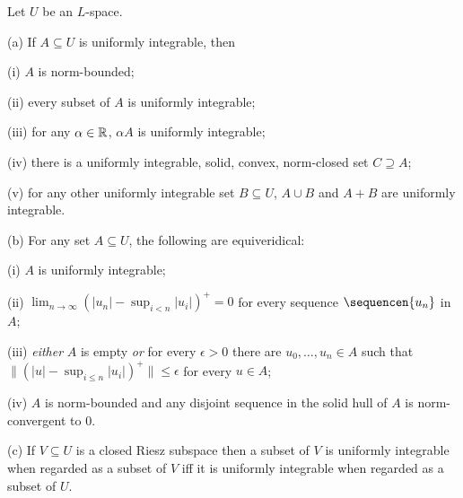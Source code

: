  Let $U$ be an $L$-space.

(a) If $A\subseteq U$ is uniformly integrable, then

\quad (i) $A$ is norm-bounded;

\quad (ii) every subset of $A$ is uniformly integrable;

\quad (iii) for any $\alpha\in\Bbb R$, $\alpha A$ is uniformly
integrable;

\quad (iv) there is a uniformly integrable, solid, convex, norm-closed
set $C\supseteq A$;

\quad (v) for any other uniformly integrable set $B\subseteq U$, $A\cup
B$ and $A+B$ are uniformly integrable.

(b) For any set $A\subseteq U$, the following are equiveridical:

\quad (i) $A$ is uniformly integrable;

\quad (ii) $\lim_{n\to\infty}(|u_n|-\sup_{i<n}|u_i|)^+=0$ for every
sequence $\sequencen{u_n}$ in $A$;

\quad (iii) {\it either} $A$ is empty {\it or} for every $\epsilon>0$
there are $u_0,\ldots,u_n\in A$ such that
\ifdim\pagewidth=390pt\penalty-1000\fi
$\|(|u|-\sup_{i\le n}|u_i|)^+\|\le\epsilon$ for every $u\in A$;

\quad (iv) $A$ is norm-bounded and any disjoint sequence in the solid
hull of $A$ is norm-convergent to $0$.

(c) If $V\subseteq U$ is a closed Riesz subspace then a subset of $V$ is
uniformly integrable when regarded as a subset of $V$ iff it is
uniformly integrable when regarded as a subset of $U$.

